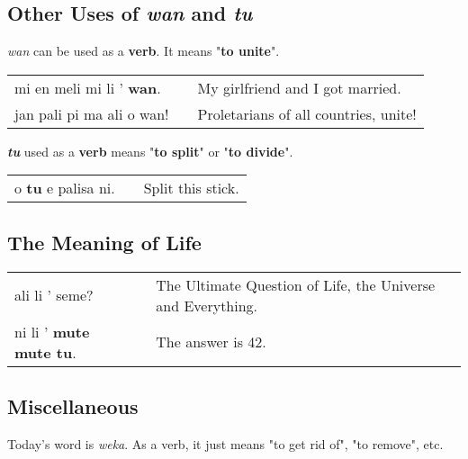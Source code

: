 \subsection*{Other Uses of \textit{wan} and \textit{tu}}
%
\textit{wan} can be used as a \textbf{verb}. 
It means "\textbf{to unite}". 

\begin{supertabular}{p{5,5cm}|ll}
mi en meli mi li ' \textbf{wan}. && My girlfriend and I got married. \\
jan pali pi ma ali o wan! && Proletarians of all countries, unite! \\

\end{supertabular} 

\textbf{\textit{tu}} used as a \textbf{verb} means "\textbf{to split}" or "\textbf{to divide}". 

\begin{supertabular}{p{5,5cm}|ll}
o \textbf{tu} e palisa ni. && Split this stick.  \\
\end{supertabular} 

\subsection*{The Meaning of Life}

\begin{supertabular}{p{5,5cm}|ll}
ali li ' seme? &&  The Ultimate Question of Life, the Universe and Everything. \\
ni li ' \textbf{mute mute tu}.  && The answer is 42. \\
\end{supertabular} 

%
\newpage
\subsection*{Miscellaneous}
%
Today's word is \textit{weka}. 
As a verb, it just means "to get rid of", "to remove", etc. 

